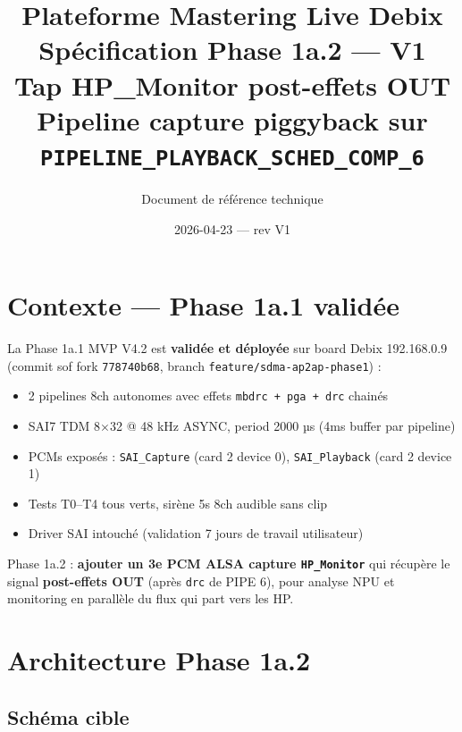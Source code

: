 \documentclass[11pt,a4paper]{article}
\title{\textbf{Plateforme Mastering Live Debix}\\[6pt]
  \Large Spécification Phase 1a.2 --- \textbf{V1}\\[4pt]
  \large Tap HP\_Monitor post-effets OUT\\
  \normalsize Pipeline capture piggyback sur \texttt{PIPELINE\_PLAYBACK\_SCHED\_COMP\_6}}
\author{Document de référence technique}
\date{2026-04-23 --- rev V1}
\begin{document}
\maketitle
\tableofcontents
\clearpage

\section{Contexte — Phase 1a.1 validée}

La Phase 1a.1 MVP V4.2 est \textbf{validée et déployée} sur board Debix 192.168.0.9 (commit sof fork \texttt{778740b68}, branch \texttt{feature/sdma-ap2ap-phase1}) :

\begin{itemize}[leftmargin=*, itemsep=1pt]
  \item 2 pipelines 8ch autonomes avec effets \texttt{mbdrc + pga + drc} chainés
  \item SAI7 TDM 8$\times$32 @ 48 kHz ASYNC, period 2000 µs (4ms buffer par pipeline)
  \item PCMs exposés : \texttt{SAI\_Capture} (card 2 device 0), \texttt{SAI\_Playback} (card 2 device 1)
  \item Tests T0--T4 tous verts, sirène 5s 8ch audible sans clip
  \item Driver SAI intouché (validation 7 jours de travail utilisateur)
\end{itemize}

Phase 1a.2 : \textbf{ajouter un 3e PCM ALSA capture \texttt{HP\_Monitor}} qui récupère le signal \textbf{post-effets OUT} (après \texttt{drc} de PIPE 6), pour analyse NPU et monitoring en parallèle du flux qui part vers les HP.

\section{Architecture Phase 1a.2}

\subsection{Schéma cible}
\end{document}
